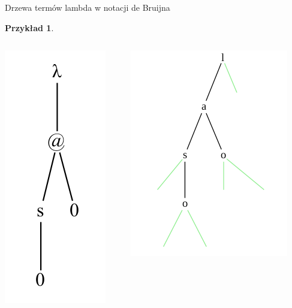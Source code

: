 \documentclass[final]{beamer}
\theoremstyle{bluetheorem}
\theoremstyle{bluetheorem}
\theoremstyle{greentheorem}
\newtheorem{myexample}[mytheorem]{Przykład}
\begin{document}
\begin{frame}{Drzewa termów lambda w notacji de Bruijna}
    \begin{myexample}
        \begin{columns}
            \begin{center}
                \includegraphics[height=\textwidth]{example_007.png}
            \end{center}
            \begin{center}
                    \raisebox{.25\textwidth}{$\equiv$}
            \end{center}
            \begin{center}
                \includegraphics[height=\textwidth]{example.png}

\end{center}
\end{columns}
\end{myexample}
\end{frame}
\end{document}
